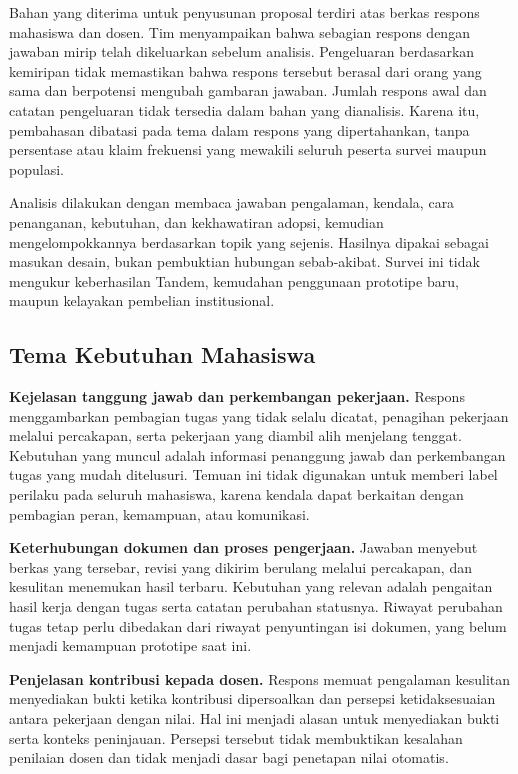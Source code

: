 \documentclass[12pt,a4paper,oneside]{report}
\begin{document}
Bahan yang diterima untuk penyusunan proposal terdiri atas berkas respons mahasiswa dan dosen. Tim menyampaikan bahwa sebagian respons dengan jawaban mirip telah dikeluarkan sebelum analisis. Pengeluaran berdasarkan kemiripan tidak memastikan bahwa respons tersebut berasal dari orang yang sama dan berpotensi mengubah gambaran jawaban. Jumlah respons awal dan catatan pengeluaran tidak tersedia dalam bahan yang dianalisis. Karena itu, pembahasan dibatasi pada tema dalam respons yang dipertahankan, tanpa persentase atau klaim frekuensi yang mewakili seluruh peserta survei maupun populasi.

Analisis dilakukan dengan membaca jawaban pengalaman, kendala, cara penanganan, kebutuhan, dan kekhawatiran adopsi, kemudian mengelompokkannya berdasarkan topik yang sejenis. Hasilnya dipakai sebagai masukan desain, bukan pembuktian hubungan sebab-akibat. Survei ini tidak mengukur keberhasilan Tandem, kemudahan penggunaan prototipe baru, maupun kelayakan pembelian institusional.

\subsection{Tema Kebutuhan Mahasiswa}
\textbf{Kejelasan tanggung jawab dan perkembangan pekerjaan.} Respons menggambarkan pembagian tugas yang tidak selalu dicatat, penagihan pekerjaan melalui percakapan, serta pekerjaan yang diambil alih menjelang tenggat. Kebutuhan yang muncul adalah informasi penanggung jawab dan perkembangan tugas yang mudah ditelusuri. Temuan ini tidak digunakan untuk memberi label perilaku pada seluruh mahasiswa, karena kendala dapat berkaitan dengan pembagian peran, kemampuan, atau komunikasi.

\textbf{Keterhubungan dokumen dan proses pengerjaan.} Jawaban menyebut berkas yang tersebar, revisi yang dikirim berulang melalui percakapan, dan kesulitan menemukan hasil terbaru. Kebutuhan yang relevan adalah pengaitan hasil kerja dengan tugas serta catatan perubahan statusnya. Riwayat perubahan tugas tetap perlu dibedakan dari riwayat penyuntingan isi dokumen, yang belum menjadi kemampuan prototipe saat ini.

\textbf{Penjelasan kontribusi kepada dosen.} Respons memuat pengalaman kesulitan menyediakan bukti ketika kontribusi dipersoalkan dan persepsi ketidaksesuaian antara pekerjaan dengan nilai. Hal ini menjadi alasan untuk menyediakan bukti serta konteks peninjauan. Persepsi tersebut tidak membuktikan kesalahan penilaian dosen dan tidak menjadi dasar bagi penetapan nilai otomatis.
\end{document}
